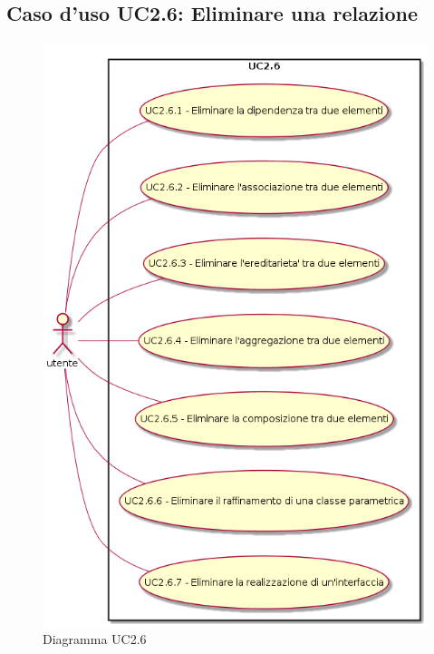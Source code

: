 \documentclass[../AnalisiDeiRequisiti.tex]{subfiles}
\begin{document}
		\subsection{Caso d'uso UC2.6: Eliminare una relazione}
		\begin{figure} [H]
			\centering
			\includegraphics[scale=0.45]{./Figures/UC2_6.png}
			\caption{Diagramma UC2.6}\label{}
		\end{figure}
\end{document}
